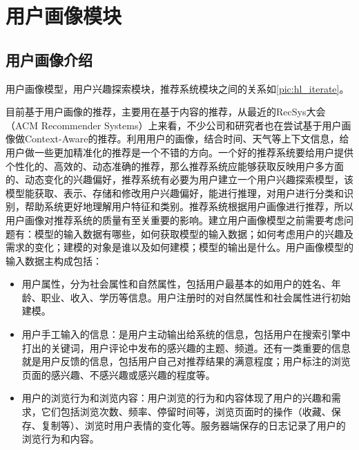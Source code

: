 	\section{用户画像模块}
		\subsection{用户画像介绍}
		用户画像模型，用户兴趣探索模块，推荐系统模块之间的关系如\autoref{pic:hl_iterate}。
		\begin{figure}
		\centering
		\label{pic:hl_iterate}
		\end{figure}

		目前基于用户画像的推荐，主要用在基于内容的推荐，从最近的RecSys大会（ACM Recommender Systems）上来看，不少公司和研究者也在尝试基于用户画像做Context-Aware的推荐。利用用户的画像，结合时间、天气等上下文信息，给用户做一些更加精准化的推荐是一个不错的方向。一个好的推荐系统要给用户提供个性化的、高效的、动态准确的推荐，那么推荐系统应能够获取反映用户多方面的、动态变化的兴趣偏好，推荐系统有必要为用户建立一个用户兴趣探索模型，该模型能获取、表示、存储和修改用户兴趣偏好，能进行推理，对用户进行分类和识别，帮助系统更好地理解用户特征和类别。推荐系统根据用户画像进行推荐，所以用户画像对推荐系统的质量有至关重要的影响。建立用户画像模型之前需要考虑问题有：模型的输入数据有哪些，如何获取模型的输入数据；如何考虑用户的兴趣及需求的变化；建模的对象是谁以及如何建模；模型的输出是什么。用户画像模型的输入数据主构成包括：
		\begin{itemize}
		\item 用户属性，分为社会属性和自然属性，包括用户最基本的如用户的姓名、年龄、职业、收入、学历等信息。用户注册时的对自然属性和社会属性进行初始建模。 
		\item 用户手工输入的信息：是用户主动输出给系统的信息，包括用户在搜索引擎中打出的关键词，用户评论中发布的感兴趣的主题、频道。还有一类重要的信息就是用户反馈的信息，包括用户自己对推荐结果的满意程度；用户标注的浏览页面的感兴趣、不感兴趣或感兴趣的程度等。
		\item 用户的浏览行为和浏览内容：用户浏览的行为和内容体现了用户的兴趣和需求，它们包括浏览次数、频率、停留时间等，浏览页面时的操作（收藏、保存、复制等）、浏览时用户表情的变化等。服务器端保存的日志记录了用户的浏览行为和内容。
		\end{itemize}

